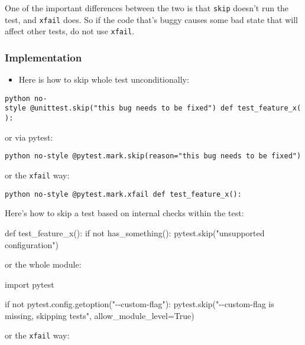 \documentclass[
]{report}
\newenvironment{Shaded}{\begin{snugshade}}{\end{snugshade}}
\newcommand{\ControlFlowTok}[1]{\textcolor[rgb]{0.00,0.23,0.31}{#1}}
\newcommand{\ImportTok}[1]{\textcolor[rgb]{0.00,0.46,0.62}{#1}}
\newcommand{\KeywordTok}[1]{\textcolor[rgb]{0.00,0.23,0.31}{#1}}
\newcommand{\NormalTok}[1]{\textcolor[rgb]{0.00,0.23,0.31}{#1}}
\newcommand{\OperatorTok}[1]{\textcolor[rgb]{0.37,0.37,0.37}{#1}}
\newcommand{\StringTok}[1]{\textcolor[rgb]{0.13,0.47,0.30}{#1}}
\newcommand{\VariableTok}[1]{\textcolor[rgb]{0.07,0.07,0.07}{#1}}
\providecommand{\tightlist}{%
  \setlength{\itemsep}{0pt}\setlength{\parskip}{0pt}}\usepackage{longtable,booktabs,array}
\begin{document}
One of the important differences between the two is that \texttt{skip}
doesn't run the test, and \texttt{xfail} does. So if the code that's
buggy causes some bad state that will affect other tests, do not use
\texttt{xfail}.

\subsubsection{Implementation}\label{implementation}

\begin{itemize}
\tightlist
\item
  Here is how to skip whole test unconditionally:
\end{itemize}

\texttt{python\ no-style\ @unittest.skip("this\ bug\ needs\ to\ be\ fixed")\ def\ test\_feature\_x():}

or via pytest:

\texttt{python\ no-style\ @pytest.mark.skip(reason="this\ bug\ needs\ to\ be\ fixed")}

or the \texttt{xfail} way:

\texttt{python\ no-style\ @pytest.mark.xfail\ def\ test\_feature\_x():}

Here's how to skip a test based on internal checks within the test:

\begin{Shaded}
\begin{Highlighting}[]
\KeywordTok{def}\NormalTok{ test\_feature\_x():}
    \ControlFlowTok{if} \KeywordTok{not}\NormalTok{ has\_something():}
\NormalTok{        pytest.skip(}\StringTok{"unsupported configuration"}\NormalTok{)}
\end{Highlighting}
\end{Shaded}

or the whole module:

\begin{Shaded}
\begin{Highlighting}[]
\ImportTok{import}\NormalTok{ pytest}

\ControlFlowTok{if} \KeywordTok{not}\NormalTok{ pytest.config.getoption(}\StringTok{"{-}{-}custom{-}flag"}\NormalTok{):}
\NormalTok{    pytest.skip(}\StringTok{"{-}{-}custom{-}flag is missing, skipping tests"}\NormalTok{, allow\_module\_level}\OperatorTok{=}\VariableTok{True}\NormalTok{)}
\end{Highlighting}
\end{Shaded}

or the \texttt{xfail} way:
\end{document}
